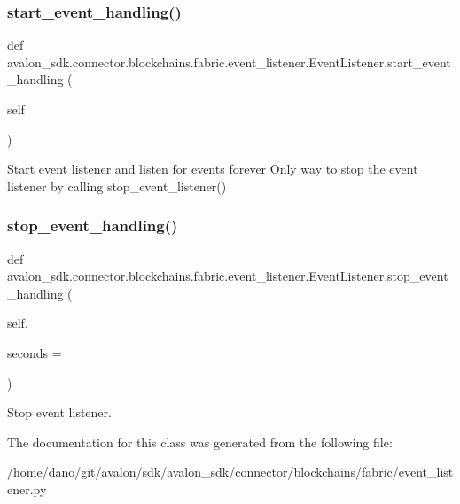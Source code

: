 \subsubsection{\texorpdfstring{start\+\_\+event\+\_\+handling()}{start\_event\_handling()}}
{\footnotesize\ttfamily def avalon\+\_\+sdk.\+connector.\+blockchains.\+fabric.\+event\+\_\+listener.\+Event\+Listener.\+start\+\_\+event\+\_\+handling (\begin{DoxyParamCaption}\item[{}]{self }\end{DoxyParamCaption})}

\begin{DoxyVerb}Start event listener and listen for events forever
Only way to stop the event listener by calling
stop_event_listener()
\end{DoxyVerb}
 \mbox{\label{classavalon__sdk_1_1connector_1_1blockchains_1_1fabric_1_1event__listener_1_1EventListener_a5199c6a4e9a39ccbd55857bdb3dfbea1}} 
\subsubsection{\texorpdfstring{stop\+\_\+event\+\_\+handling()}{stop\_event\_handling()}}
{\footnotesize\ttfamily def avalon\+\_\+sdk.\+connector.\+blockchains.\+fabric.\+event\+\_\+listener.\+Event\+Listener.\+stop\+\_\+event\+\_\+handling (\begin{DoxyParamCaption}\item[{}]{self,  }\item[{}]{seconds = {} }\end{DoxyParamCaption})}

\begin{DoxyVerb}Stop event listener.
\end{DoxyVerb}
 

The documentation for this class was generated from the following file\+:\begin{DoxyCompactItemize}
\item 
/home/dano/git/avalon/sdk/avalon\+\_\+sdk/connector/blockchains/fabric/event\+\_\+listener.\+py\end{DoxyCompactItemize}
